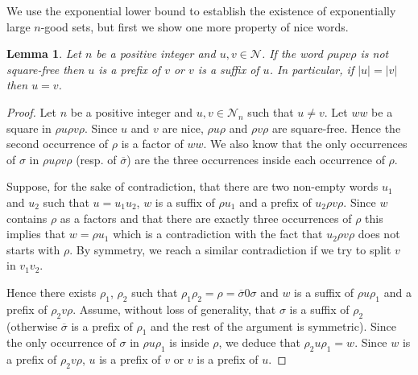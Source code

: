 \documentclass[a4paper,12pt]{article}
\newtheorem{lemma}{Lemma}
\newcommand{\pal}{\rho}
\newcommand{\hpal}{\sigma}
\begin{document}
We use the exponential lower bound to establish the existence of exponentially large $n$-good sets, but first we show one more property of nice words.

\begin{lemma}\label{shortsquareinpref}
Let $n$ be a positive integer and $u,v\in \mathcal{N}$. If the word $\pal u\pal v\pal$ is not square-free then $u$ is a prefix of $v$ or $v$ is a suffix of $u$. 
In particular, if $|u|=|v|$ then $u=v$.
\end{lemma}
\begin{proof}
Let $n$ be a positive integer and $u,v\in \mathcal{N}_n$ such that $u\not=v$.
Let $ww$ be a square in $\pal u\pal v\pal$.
Since $u$ and $v$ are nice, $\pal u\pal$ and $\pal v\pal$ are square-free. Hence the second occurrence of $\pal$ is a factor of $ww$. We also know that the only occurrences  of $\hpal$ in $\pal u\pal v\pal$ (resp. of $\overline{\hpal}$) are the three occurrences inside each occurrence of $\pal$.

Suppose, for the sake of contradiction, that there are two non-empty words $u_1$ and $u_2$ such that $u=u_1u_2$, $w$ is a suffix of $\pal u_1$ and a prefix of $u_2\pal v\pal$. Since $w$ contains $\pal$ as a factors and that there are exactly three occurrences of $\pal$ this implies that $w= \pal u_1$ which is a contradiction with the fact that $u_2\pal v\pal$  does not starts with $\pal$. By symmetry, we reach a similar contradiction if we try to split $v$ in $v_1v_2$.

Hence there exists $\pal_1$, $\pal_2$ such that $\pal_1\pal_2=\pal= \overline{\hpal} 0 \hpal$ and $w$ is a suffix of $\pal u\pal_1$ and a prefix of $\pal_2v\pal$.
Assume, without loss of generality, that $\hpal$ is a suffix of $\pal_2$ (otherwise $\overline{\hpal}$  is a prefix of $\pal_1$ and the rest of the argument is symmetric).
Since the only occurrence of $\hpal$ in $\pal u\pal_1$ is inside $\pal$, we deduce that $\pal_2 u\pal_1=w$. Since $w$ is a prefix of $\pal_2v\pal$, $u$ is a prefix of $v$ or $v$ is a prefix of $u$.
\end{proof}
\end{document}
